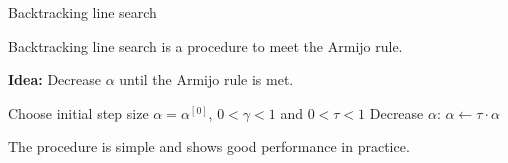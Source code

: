 \documentclass[11pt,compress,t,notes=noshow, xcolor=table]{beamer}
\begin{document}
	\begin{vbframe}{Backtracking line search}
		
		Backtracking line search is a procedure to meet the Armijo rule.
		
		\lz
		
		\textbf{Idea: } Decrease $\alpha$ until the Armijo rule is met.
		
		\begin{algorithm}[H]
			\caption{Backtracking line search}
			\begin{algorithmic}[1]
				\State Choose initial step size $\alpha = \alpha^{[0]}$, $0 < \gamma < 1$ and $0 < \tau < 1$
				\State Decrease $\alpha$: $\alpha \leftarrow \tau \cdot \alpha$
				\EndWhile
			\end{algorithmic}
		\end{algorithm}
		
		The procedure is simple and shows good performance in practice.
		
	\end{vbframe}
	
\end{document}
